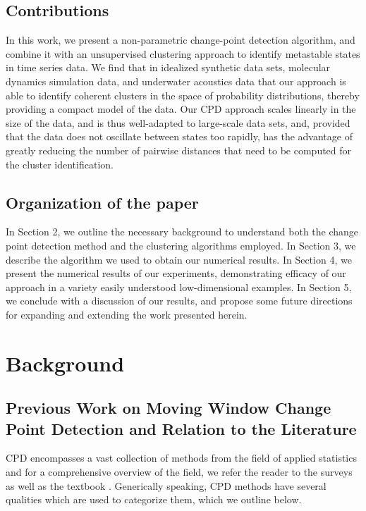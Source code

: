 \documentclass{article}
\begin{document}
\subsection{Contributions}
In this work, we present a non-parametric change-point detection algorithm, and combine it with an unsupervised clustering approach to identify metastable states in time series data. We find that in idealized synthetic data sets, molecular dynamics simulation data, and underwater acoustics data that our approach is able to identify coherent clusters in the space of probability distributions, thereby providing a compact model of the data. Our CPD approach scales linearly in the size of the data, and is thus well-adapted to large-scale data sets, and, provided that the data does not oscillate between states too rapidly, has the advantage of greatly reducing the number of pairwise distances that need to be computed for the cluster identification. 

\subsection{Organization of the paper}
In Section 2, we outline the necessary background to understand both the change point detection method and the clustering algorithms employed. In Section 3, we describe the algorithm we used to obtain our numerical results. In Section 4, we present the numerical results of our experiments, demonstrating efficacy of our approach in a variety easily understood low-dimensional examples. In Section 5, we conclude with a discussion of our results, and propose some future directions for expanding and extending the work presented herein.

\section{Background}
\subsection{Previous Work on Moving Window Change Point Detection and Relation to the Literature}
CPD encompasses a vast collection of methods from the field of applied statistics and for a comprehensive overview of the field, we refer the reader to the  surveys \cite{aminikhanghahiSurveyMethodsTime2017, reevesReviewComparisonChangepoint2007, niuMultipleChangePointDetection2016, truongSelectiveReviewOffline2020} as well as the textbook \cite{BassevilleNikiforovBook}. Generically speaking, CPD methods have several qualities which are used to categorize them, which we outline below. 
\end{document}
